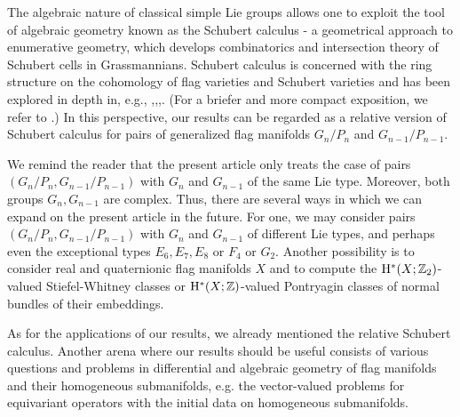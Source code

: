 The algebraic nature of classical simple Lie groups allows one to exploit 
the tool of algebraic geometry known as the Schubert calculus - a geometrical 
approach to enumerative geometry, which develops combinatorics and 
intersection theory of Schubert cells in Grassmannians.
Schubert calculus is concerned with the ring structure on the cohomology
of flag
varieties and Schubert varieties and has been explored in depth in, e.g., 
\cite{bernstein1973schubert},\cite{hiller1986pieri},\cite{pragacz1994pieri},\cite{pragacz2003pieri}. (For a briefer and more compact exposition, we refer to \cite{naughton2021schubert}.)
In this perspective, our results can be regarded as a relative version of Schubert calculus 
for pairs of generalized flag manifolds $G_{n}/P_{n}$ and $G_{n-1}/P_{n-1}$.

We remind the reader that the present article only treats the case of pairs $(G_{n}/P_{n}, G_{n-1}/P_{n-1})$ with $G_{n}$ and $G_{n-1}$ of the same Lie type. Moreover, both groups $G_{n}, G_{n-1}$ are complex. Thus, there are several ways in which we can expand on the present article in the future. For one, we may consider pairs $(G_{n}/P_{n}, G_{n-1}/P_{n-1})$ with $G_{n}$ and $G_{n-1}$ of different Lie types, and perhaps even the exceptional types $E_{6}, E_{7}, E_{8}$ or $F_{4}$ or $G_{2}$. Another possibility is to consider real and quaternionic flag manifolds $X$ and to compute the $\mathrm{H}^{*}(X; \mathbb{Z}_{2})$-valued Stiefel-Whitney classes or $\mathrm{H}^{*}(X; \mathbb{Z})$-valued Pontryagin classes of normal bundles of their embeddings. 

As for the applications of our results, we already mentioned the relative Schubert calculus. Another arena
where our results should be useful consists of various questions and problems in differential and algebraic geometry
of flag manifolds and their homogeneous submanifolds, e.g. the vector-valued problems for equivariant operators
with the initial data on homogeneous submanifolds. 

